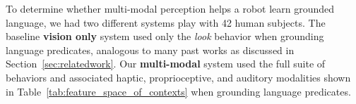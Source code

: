 To determine whether multi-modal perception helps a robot learn grounded language, we had two different systems play \ispy with 42 human subjects.
The baseline \textbf{vision only} system used only the \textit{look} behavior when grounding language predicates, analogous to many past works as discussed in Section~\ref{sec:relatedwork}.
Our \textbf{multi-modal} system used the full suite of behaviors and associated haptic, proprioceptive, and auditory modalities shown in Table~\ref{tab:feature_space_of_contexts} when grounding language predicates.